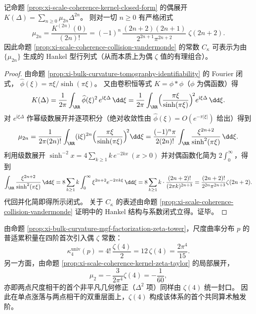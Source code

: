\begin{proposition}\label{prop:xi-scale-coherence-kernel-zeta-taylor}
记命题 \ref{prop:xi-scale-coherence-kernel-closed-form} 的偶展开 \(K(\Delta)=\sum_{n\ge 0}\mu_{2n}\Delta^{2n}\)。
则对一切 \(n\ge 0\) 有严格闭式
\[
\boxed{\;
\mu_{2n}
=\frac{K^{(2n)}(0)}{(2n)!}
=(-1)^n\,\frac{(2n+2)(2n+1)}{2^{2n+1}\pi^{2n+2}}\;\zeta(2n+2).\;}
\]
因此命题 \ref{prop:xi-scale-coherence-collision-vandermonde} 的常数 \(C_\kappa\) 可表示为由 \(\{\mu_{2n}\}\) 生成的 Hankel 型行列式（从而本质上为偶 \(\zeta\) 值的有理组合）。
\end{proposition}
\begin{proof}
由命题 \ref{prop:xi-bulk-curvature-tomography-identifiability} 的 Fourier 闭式，
\(
\widehat\phi(\xi)=\pi\xi/\sinh(\pi\xi)
\)。
又由卷积恒等式 \(K=\phi\ast\phi\)（\(\phi\) 为偶函数）得
\[
K(\Delta)=\frac{1}{2\pi}\int_{\RR}\widehat\phi(\xi)^2\,e^{\mathrm{i}\xi\Delta}\,\dd\xi
=\frac{1}{2\pi}\int_{\RR}\Bigl(\frac{\pi\xi}{\sinh(\pi\xi)}\Bigr)^{\!2}e^{\mathrm{i}\xi\Delta}\,\dd\xi.
\]
对 \(e^{\mathrm{i}\xi\Delta}\) 作幂级数展开并逐项积分（绝对收敛性由 \(\widehat\phi(\xi)=O(e^{-\pi|\xi|})\) 给出）得到
\[
\mu_{2n}
=\frac{1}{2\pi(2n)!}\int_{\RR}(\mathrm{i}\xi)^{2n}\Bigl(\frac{\pi\xi}{\sinh(\pi\xi)}\Bigr)^{\!2}\dd\xi
=\frac{(-1)^n\pi}{2(2n)!}\int_{\RR}\frac{\xi^{2n+2}}{\sinh^2(\pi\xi)}\,\dd\xi.
\]
利用级数展开
\(
\sinh^{-2}x=4\sum_{k\ge 1}k\,e^{-2kx}\ (x>0)
\)
并对偶函数化简为 \(2\int_0^\infty\)，得到
\[
\int_{\RR}\frac{\xi^{2n+2}}{\sinh^2(\pi\xi)}\,\dd\xi
=8\sum_{k\ge 1}k\int_0^\infty \xi^{2n+2}e^{-2\pi k\xi}\,\dd\xi
=8\sum_{k\ge 1}k\cdot\frac{(2n+2)!}{(2\pi k)^{2n+3}}
=\frac{(2n+2)!}{2^{2n}\pi^{2n+3}}\zeta(2n+2).
\]
代回并化简即得所示闭式。
关于 \(C_\kappa\) 的表述由命题 \ref{prop:xi-scale-coherence-collision-vandermonde} 证明中的 Hankel 结构与系数闭式立得。证毕。
\end{proof}

\begin{remark}[\texorpdfstring{$q=4$}{q=4} 的 \texorpdfstring{$\zeta$}{zeta} 共振起点：\texorpdfstring{$\zeta(4)$}{zeta(4)} 同时作为单点非高斯与两点相干的首个触发阶]\label{rem:xi-zeta4-resonance-threshold}
由命题 \ref{prop:xi-bulk-curvature-mgf-factorization-zeta-tower}，尺度曲率分布 \(p\) 的普适累积量在四阶首次引入偶 \(\zeta\) 常数：
\[
\kappa_{4}^{\mathrm{univ}}(p)=4!\,\frac{\zeta(4)}{2}=12\,\zeta(4)=\frac{2\pi^4}{15}.
\]
另一方面，由命题 \ref{prop:xi-scale-coherence-kernel-zeta-taylor} 的局部展开，
\[
\mu_{2}=-\,\frac{3}{2\pi^{4}}\zeta(4)=-\frac{1}{60},
\]
亦即两点尺度相干的首个非平凡几何修正（\(\Delta^2\) 项）同样由 \(\zeta(4)\) 统一封口。
因此在单点涨落与两点相干的双重层面上，\(\zeta(4)\) 构成该体系的首个共同算术触发阶。
\end{remark}

